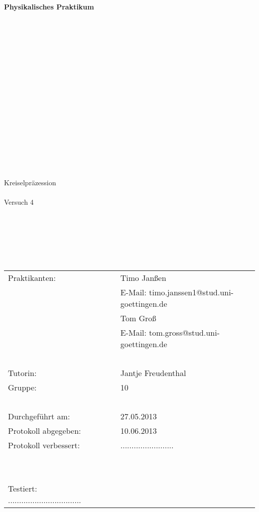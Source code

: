 \begin{center}
    {\Huge{\textbf{Physikalisches Praktikum}}}\\[16pt]
\ \\
\ \\
\ \\
\ \\
\ \\
\ \\
\ \\
\ \\
\ \\
\ \\
\ \\
\ \\
\ \\
\ \\
\ \\
\ \\
\ \\
\huge{Kreiselpräzession}
\ \\
\ \\
\large{Versuch 4}
\end{center}

\normalsize
\ \\
\ \\
\ \\
\ \\
\ \\

\begin{center}
\begin{tabular}{lcl}
      Praktikanten: & ~ & Timo Janßen \\
                    & ~ & E-Mail: timo.janssen1@stud.uni-goettingen.de \\
		    & ~ & Tom Groß \\
		    & ~ & E-Mail: tom.gross@stud.uni-goettingen.de \\
\ \\		    
      Tutorin: & ~ & Jantje Freudenthal \\
      Gruppe: & ~ & 10 \\
\ \\      
      Durchgeführt am: & ~ & 27.05.2013 \\
      Protokoll abgegeben: & ~ & 10.06.2013 \\
      Protokoll verbessert: & ~ & ........................\\
\ \\
\ \\
      Testiert: .................................    
\end{tabular}\\
\end{center}
